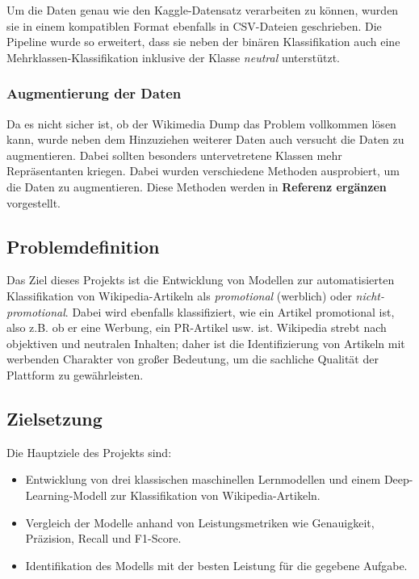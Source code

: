 Um die Daten genau wie den Kaggle-Datensatz verarbeiten zu können, wurden sie in einem kompatiblen Format ebenfalls in CSV-Dateien geschrieben. Die Pipeline wurde so erweitert, dass sie neben der binären Klassifikation auch eine Mehrklassen-Klassifikation inklusive der Klasse \emph{neutral} unterstützt.

\subsubsection{Augmentierung der Daten}
Da es nicht sicher ist, ob der Wikimedia Dump das Problem vollkommen lösen kann, wurde neben dem Hinzuziehen weiterer Daten auch versucht die Daten zu augmentieren. Dabei sollten besonders untervetretene Klassen mehr Repräsentanten kriegen. Dabei wurden verschiedene Methoden ausprobiert, um die Daten zu augmentieren. Diese Methoden werden in \textbf{Referenz ergänzen} vorgestellt.

\subsection{Problemdefinition}
Das Ziel dieses Projekts ist die Entwicklung von Modellen zur automatisierten Klassifikation von Wikipedia-Artikeln als \emph{promotional} (werblich) oder \emph{nicht-promotional}. Dabei wird ebenfalls klassifiziert, wie ein Artikel promotional ist, also z.B. ob er eine Werbung, ein PR-Artikel usw. ist. Wikipedia strebt nach objektiven und neutralen Inhalten; daher ist die Identifizierung von Artikeln mit werbenden Charakter von großer Bedeutung, um die sachliche Qualität der Plattform zu gewährleisten.

\subsection{Zielsetzung}

Die Hauptziele des Projekts sind:

\begin{itemize} \item Entwicklung von drei klassischen maschinellen Lernmodellen und einem Deep-Learning-Modell zur Klassifikation von Wikipedia-Artikeln. \item Vergleich der Modelle anhand von Leistungsmetriken wie Genauigkeit, Präzision, Recall und F1-Score. \item Identifikation des Modells mit der besten Leistung für die gegebene Aufgabe. \end{itemize}